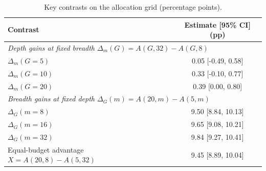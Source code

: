 \begin{table}[htbp]
\centering
\small
\begin{tabular}{lc}
\toprule
Contrast & Estimate [95\% CI] (pp) \\
\midrule
\multicolumn{2}{l}{\textit{Depth gains at fixed breadth $\Delta_m(G) = A(G, 32) - A(G, 8)$}} \\
$\Delta_m(G=5)$ & 0.05 [-0.49, 0.58] \\
$\Delta_m(G=10)$ & 0.33 [-0.10, 0.77] \\
$\Delta_m(G=20)$ & 0.39 [0.00, 0.80] \\
\midrule
\multicolumn{2}{l}{\textit{Breadth gains at fixed depth $\Delta_G(m) = A(20, m) - A(5, m)$}} \\
$\Delta_G(m=8)$ & 9.50 [8.84, 10.13] \\
$\Delta_G(m=16)$ & 9.65 [9.08, 10.21] \\
$\Delta_G(m=32)$ & 9.84 [9.27, 10.41] \\
\midrule
Equal-budget advantage $X = A(20, 8) - A(5, 32)$ & 9.45 [8.89, 10.04] \\
\bottomrule
\end{tabular}
\caption{Key contrasts on the allocation grid (percentage points).}
\label{tab:breadth_contrasts}
\end{table}
